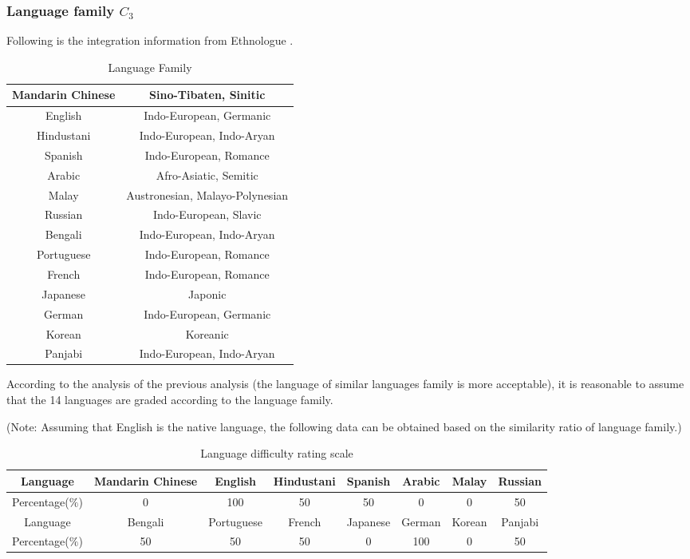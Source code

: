 \documentclass{mcmthesis}
\begin{document}
\subsubsection{Language family $C_3$}
Following is the integration information from Ethnologue \cite{1}.
\begin{table}[!ht]
  \centering
  \begin{tabular}{ c | c  }
    \hline

    Mandarin Chinese & Sino-Tibaten, Sinitic \\ \hline
    English & Indo-European, Germanic\\  \hline
    Hindustani &Indo-European, Indo-Aryan  \\  \hline
    Spanish & Indo-European, Romance \\  \hline
    Arabic & Afro-Asiatic, Semitic \\  \hline
    Malay & Austronesian, Malayo-Polynesian  \\  \hline
    Russian & Indo-European, Slavic  \\  \hline
    Bengali & Indo-European, Indo-Aryan  \\  \hline
    Portuguese & Indo-European, Romance  \\  \hline
    French & Indo-European, Romance  \\  \hline
    Japanese & Japonic  \\  \hline
    German & Indo-European, Germanic \\  \hline
    Korean & Koreanic  \\  \hline
    Panjabi & Indo-European, Indo-Aryan  \\  \hline
  \end{tabular}
  \caption{Language Family}
  \label{Language Family}
\end{table}

According to the analysis of the previous analysis (the language of similar languages family is more acceptable), it is reasonable to assume that the 14 languages are graded according to the language family.

(Note: Assuming that English is the native language, the following data can be obtained based on the similarity ratio of language family.)
\begin{table}[!ht]
  \centering
  \begin{tabular}{ c | c | c | c | c | c | c | c }
    \hline
    Language & Mandarin Chinese & English & Hindustani & Spanish & Arabic & Malay & Russian \\ \hline
    Percentage($\%$) & 0 & 100 & 50 & 50 & 0 & 0 & 50 \\ \hline
    Language & Bengali & Portuguese & French & Japanese & German & Korean & Panjabi \\  \hline
    Percentage($\%$) & 50 & 50 & 50 & 0 & 100 & 0 & 50 \\  \hline
  \end{tabular}
  \caption{Language difficulty rating scale}
  \label{Language difficulty rating scale}
\end{table}
\end{document}

